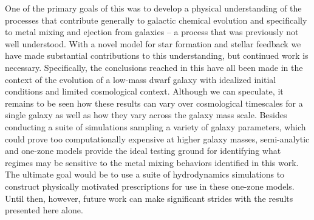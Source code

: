 One of the primary goals of this \dissertation was to develop a physical understanding of the processes that contribute generally to galactic chemical evolution and specifically to metal mixing and ejection from galaxies -- a process that was previously not well understood. With a novel model for star formation and stellar feedback we have made substantial contributions to this understanding, but continued work is necessary. Specifically, the conclusions reached in this \dissertation have all been made in the context of the evolution of a low-mass dwarf galaxy with idealized initial conditions and limited cosmological context. Although we can speculate, it remains to be seen how these results can vary over cosmological timescales for a single galaxy as well as how they vary across the galaxy mass scale. Besides conducting a suite of simulations sampling a variety of galaxy parameters, which could prove too computationally expensive at higher galaxy masses, semi-analytic and one-zone models provide the ideal testing ground for identifying what regimes may be sensitive to the metal mixing behaviors identified in this work. The ultimate goal would be to use a suite of hydrodynamics simulations to construct physically motivated prescriptions for use in these one-zone models. Until then, however, future work can make significant strides with the results presented here alone.

